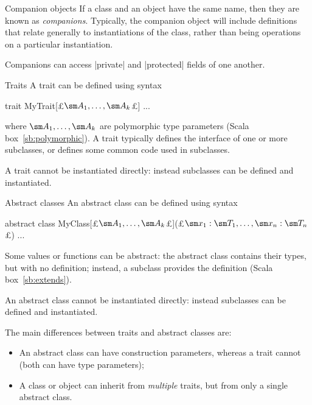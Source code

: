 
\begin{scalaBox}{Companion objects}
\label{sb:companion}
If a class and an object have the same name, then they are known as
\emph{companions}.  Typically, the companion object will include definitions
that relate generally to instantiations of the class, rather than being
operations on a particular instantiation.

Companions can access |private| and |protected| fields of one another. 
\end{scalaBox}


\begin{scalaBox}{Traits}
\label{sb:traits}
A trait can be defined using syntax 
\begin{scala}
  trait MyTrait[£$\sm A_1, \ldots, \sm A_k$£]{ ... }
\end{scala}
where $\sm A_1, \ldots, \sm A_k$ are polymorphic type parameters (Scala
box~\ref{sb:polymorphic}).  A trait typically defines the interface of one or
more subclasses, or defines some common code used in subclasses.  

A trait cannot be instantiated directly: instead subclasses can be defined and
instantiated.
\end{scalaBox}


\begin{scalaBox}{Abstract classes}
\label{sb:abstract-class}
An abstract class can be defined using syntax
\begin{scala}
  abstract class MyClass[£$\sm A_1, \ldots, \sm A_k$£](£$\sm x_1: \sm T_1, \ldots, \sm x_n: \sm T_n$£){ ... } 
\end{scala}
%
Some values or functions can be abstract: the abstract class contains their
types, but with no definition; instead, a subclass provides the definition
(Scala box~\ref{sb:extends}).

An abstract class cannot be instantiated directly: instead subclasses can be
defined and instantiated.

The main differences between traits and  abstract classes are:
\begin{itemize}
\item An abstract class can have construction parameters, whereas a trait
  cannot (both can have type parameters);

\item A class or object can inherit from \emph{multiple} traits, but from only
  a single abstract class.
\end{itemize}
\end{scalaBox}

